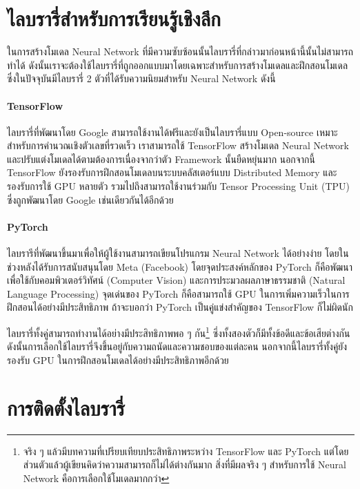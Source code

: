 \section{ไลบรารี่สำหรับการเรียนรู้เชิงลึก}
\label{sec:lib_dl}

ในการสร้างโมเดล Neural Network ที่มีความซับซ้อนนั้นไลบรารี่ที่กล่าวมาก่อนหน้านี้นั้นไม่สามารถทำได้ ดังนั้นเราจะต้องใช้ไลบรารี่ที่ถูกออกแบบมาโดยเฉพาะสำหรับการสร้างโมเดลและฝึกสอนโมเดล ซึ่งในปัจจุบันมีไลบรารี่ 2 ตัวที่ได้รับความนิยมสำหรับ Neural Network ดังนี้
%
\paragraph{TensorFlow}
ไลบรารี่ที่พัฒนาโดย Google สามารถใช้งานได้ฟรีและยังเป็นไลบรารี่แบบ Open-source เหมาะสำหรับการคำนวณเชิงตัวเลขที่รวดเร็ว เราสามารถใช้ TensorFlow สร้างโมเดล Neural Network และปรับแต่งโมเดลได้ตามต้องการเนื่องจากว่าตัว Framework นั้นยืดหยุ่นมาก นอกจากนี้ TensorFlow ยังรองรับการฝึกสอนโมเดลบนระบบคลัสเตอร์แบบ Distributed Memory และรองรับการใช้ GPU หลายตัว รวมไปถึงสามารถใช้งานร่วมกับ Tensor Processing Unit (TPU) ซึ่งถูกพัฒนาโดย Google เช่นเดียวกันได้อีกด้วย

\paragraph{PyTorch} ไลบรารีที่พัฒนาขึ้นมาเพื่อให้ผู้ใช้งานสามารถเขียนโปรแกรม Neural Network ได้อย่างง่าย โดยในช่วงหลังได้รับการสนับสนุนโดย Meta (Facebook) โดยจุดประสงค์หลักของ PyTorch ก็คือพัฒนาเพื่อใช้กับคอมพิวเตอร์วิทัศน์ (Computer Vision) และการประมวลผลภาษาธรรมชาติ (Natural Language Processing) จุดเด่นของ PyTorch ก็คือสามารถใช้ GPU ในการเพิ่มความเร็วในการฝึกสอนได้อย่างมีประสิทธิภาพ ถ้าจะบอกว่า PyTorch เป็นคู่แข่งสำคัญของ TensorFlow ก็ไม่ผิดนัก

ไลบรารี่ทั้งคู่สามารถทำงานได้อย่างมีประสิทธิภาพพอ ๆ กัน\footnote{จริง ๆ แล้วมีบทความที่เปรียบเทียบประสิทธิภาพระหว่าง TensorFlow และ PyTorch แต่โดยส่วนตัวแล้วผู้เขียนคิดว่าความสามารถก็ไม่ได้ต่างกันมาก สิ่งที่มีผลจริง ๆ สำหรับการใช้ Neural Network คือการเลือกใช้โมเดลมากกว่า} ซึ่งทั้งสองตัวก็มีทั้งข้อดีและข้อเสียต่างกัน ดังนั้นการเลือกใช้ไลบรารี่จึงขึ้นอยู่กับความถนัดและความชอบของแต่ละคน นอกจากนี้ไลบรารี่ทั้งคู่ยังรองรับ GPU ในการฝึกสอนโมเดลได้อย่างมีประสิทธิภาพอีกด้วย

\section{การติดตั้งไลบรารี่}
\label{sec:install_lib_dl}

